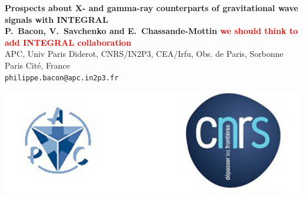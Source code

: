 \documentclass[a0,portrait]{a0poster}
\newcommand{\vs}[1] {\textbf{\textcolor{red}{#1}}}
\begin{document}


\begin{minipage}[b]{0.75\linewidth}
  \Huge \textbf{ 	Prospects about X- and gamma-ray counterparts of gravitational wave signals with INTEGRAL}\\[1cm] %
  \large \textbf{P.~Bacon, V.~Savchenko and E.~Chassande-Mottin \vs{we should think to add INTEGRAL collaboration}}\\[1cm] %
  \normalsize APC, Univ Paris Diderot, CNRS/IN2P3, CEA/Irfu, Obs. de Paris, Sorbonne Paris Cit\'e, France\\
  \large \texttt{philippe.bacon@apc.in2p3.fr}\\
\end{minipage}
%
\begin{minipage}[b]{0.25\linewidth}
	\includegraphics[scale=.8]{logo.png}
\end{minipage}

\vspace{1cm} %

\end{document}
